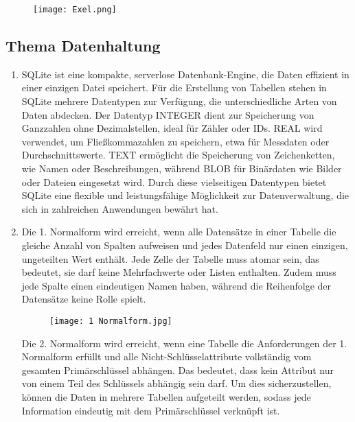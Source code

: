\documentclass{article}
\begin{document}
\begin{enumerate}
\begin{figure}[h] %
    \centering
    \texttt{[image: Exel.png]}
\end{figure}

\end{enumerate}
\subsection{Thema Datenhaltung}
\begin{enumerate}
\item SQLite ist eine kompakte, serverlose Datenbank-Engine, die Daten effizient in einer einzigen Datei speichert. Für die Erstellung von Tabellen stehen in SQLite mehrere Datentypen zur Verfügung, die unterschiedliche Arten von Daten abdecken. Der Datentyp INTEGER dient zur Speicherung von Ganzzahlen ohne Dezimalstellen, ideal für Zähler oder IDs. REAL wird verwendet, um Fließkommazahlen zu speichern, etwa für Messdaten oder Durchschnittswerte. TEXT ermöglicht die Speicherung von Zeichenketten, wie Namen oder Beschreibungen, während BLOB für Binärdaten wie Bilder oder Dateien eingesetzt wird. Durch diese vielseitigen Datentypen bietet SQLite eine flexible und leistungsfähige Möglichkeit zur Datenverwaltung, die sich in zahlreichen Anwendungen bewährt hat.
\item Die 1. Normalform wird erreicht, wenn alle Datensätze in einer Tabelle die gleiche Anzahl von Spalten aufweisen und jedes Datenfeld nur einen einzigen, ungeteilten Wert enthält. Jede Zelle der Tabelle muss atomar sein, das bedeutet, sie darf keine Mehrfachwerte oder Listen enthalten. Zudem muss jede Spalte einen eindeutigen Namen haben, während die Reihenfolge der Datensätze keine Rolle spielt.
\begin{figure}[H] %
    \centering
    \texttt{[image: 1 Normalform.jpg]}
\end{figure}

Die 2. Normalform wird erreicht, wenn eine Tabelle die Anforderungen der 1. Normalform erfüllt und alle Nicht-Schlüsselattribute vollständig vom gesamten Primärschlüssel abhängen. Das bedeutet, dass kein Attribut nur von einem Teil des Schlüssels abhängig sein darf. Um dies sicherzustellen, können die Daten in mehrere Tabellen aufgeteilt werden, sodass jede Information eindeutig mit dem Primärschlüssel verknüpft ist.



\end{enumerate}
\end{document}
